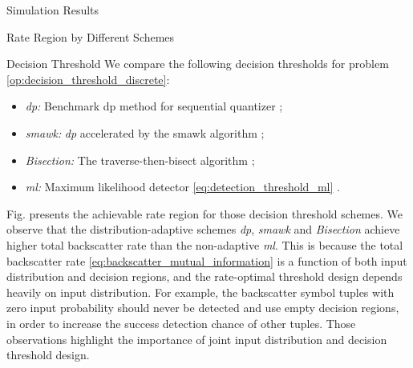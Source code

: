 \documentclass[journal]{IEEEtran}
\begin{document}
\begin{section}{Simulation Results}
\begin{subsection}{Rate Region by Different Schemes}
		\begin{subsubsection}{Decision Threshold}
			We compare the following decision thresholds for problem \eqref{op:decision_threshold_discrete}:
			\begin{itemize}
				\item \emph{\gls{dp}:} Benchmark \gls{dp} method for sequential quantizer \cite{He2021};
				\item \emph{\gls{smawk}:} \emph{\gls{dp}} accelerated by the \gls{smawk} algorithm \cite{He2021};
				\item \emph{Bisection:} The traverse-then-bisect algorithm \cite{Nguyen2020a};
				\item \emph{\gls{ml}:} Maximum likelihood detector \eqref{eq:detection_threshold_ml} \cite{Qian2019}.
			\end{itemize}

			Fig.  presents the achievable rate region for those decision threshold schemes.
			We observe that the distribution-adaptive schemes \emph{\gls{dp}}, \emph{\gls{smawk}} and \emph{Bisection} achieve higher total backscatter rate than the non-adaptive \emph{\gls{ml}}.
			This is because the total backscatter rate \eqref{eq:backscatter_mutual_information} is a function of both input distribution and decision regions, and the rate-optimal threshold design depends heavily on input distribution.
			For example, the backscatter symbol tuples with zero input probability should never be detected and use empty decision regions, in order to increase the success detection chance of other tuples.
			Those observations highlight the importance of joint input distribution and decision threshold design.
		\end{subsubsection}

	\end{subsection}



\end{section}
\end{document}
